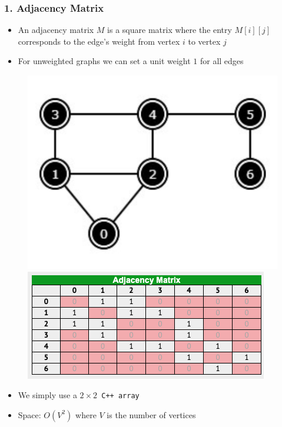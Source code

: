 \documentclass{beamer}
\begin{document}
\begin{frame}[fragile]
\frametitle{1. Adjacency Matrix}
	\begin{itemize}
	    \item An adjacency matrix $M$ is a square matrix where the entry $M[i][j]$ corresponds to the edge's weight from vertex $i$ to vertex $j$
	    \item For unweighted graphs we can set a unit weight $1$ for all edges
	\end{itemize}
	\begin{figure}
	    \centering
	    \includegraphics[scale=0.45]{imgs/2.4/graph/graph.png}
	    \hspace{0.4cm}
	    \includegraphics[scale=0.4]{imgs/2.4/graph/adjacency-matrix.png}	    
	\end{figure}
	\begin{itemize}
	    \item We simply use a $2\times2$\verb| C++ array|
	    \item Space: $O(V^2)$ where $V$ is the number of vertices
	\end{itemize}
\end{frame}
\end{document}
